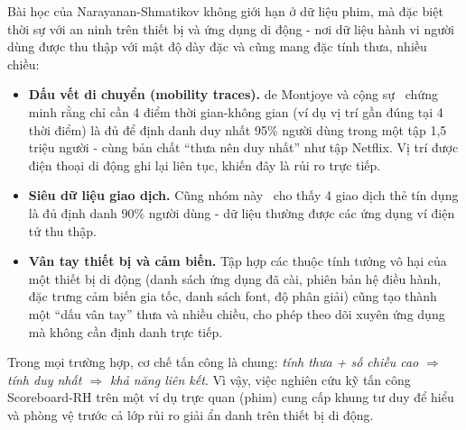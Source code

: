 Bài học của Narayanan-Shmatikov không giới hạn ở dữ liệu phim, mà đặc biệt thời sự với an ninh trên thiết bị và ứng dụng di động - nơi dữ liệu hành vi người dùng được thu thập với mật độ dày đặc và cũng mang đặc tính thưa, nhiều chiều:
\renewcommand{\labelitemi}{$-$}
\begin{itemize}
	\item \textbf{Dấu vết di chuyển (mobility traces).} de Montjoye và cộng sự~\cite{demontjoye} chứng minh rằng chỉ cần 4 điểm thời gian-không gian (ví dụ vị trí gần đúng tại 4 thời điểm) là đủ để định danh duy nhất 95\% người dùng trong một tập 1,5 triệu người - cùng bản chất ``thưa nên duy nhất'' như tập Netflix. Vị trí được điện thoại di động ghi lại liên tục, khiến đây là rủi ro trực tiếp.
	\item \textbf{Siêu dữ liệu giao dịch.} Cũng nhóm này~\cite{demontjoye2} cho thấy 4 giao dịch thẻ tín dụng là đủ định danh 90\% người dùng - dữ liệu thường được các ứng dụng ví điện tử thu thập.
	\item \textbf{Vân tay thiết bị và cảm biến.} Tập hợp các thuộc tính tưởng vô hại của một thiết bị di động (danh sách ứng dụng đã cài, phiên bản hệ điều hành, đặc trưng cảm biến gia tốc, danh sách font, độ phân giải) cũng tạo thành một ``dấu vân tay'' thưa và nhiều chiều, cho phép theo dõi xuyên ứng dụng mà không cần định danh trực tiếp.
\end{itemize}

Trong mọi trường hợp, cơ chế tấn công là chung: \textit{tính thưa + số chiều cao $\Rightarrow$ tính duy nhất $\Rightarrow$ khả năng liên kết}. Vì vậy, việc nghiên cứu kỹ tấn công Scoreboard-RH trên một ví dụ trực quan (phim) cung cấp khung tư duy để hiểu và phòng vệ trước cả lớp rủi ro giải ẩn danh trên thiết bị di động.
